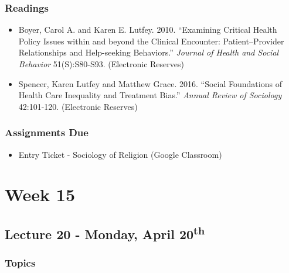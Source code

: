 \documentclass[]{book}
\providecommand{\tightlist}{%
  \setlength{\itemsep}{0pt}\setlength{\parskip}{0pt}}
\begin{document}
\hypertarget{readings-23}{%
\subsubsection*{Readings}\label{readings-23}}

\begin{itemize}
\tightlist
\item
  Boyer, Carol A. and Karen E. Lutfey. 2010. ``Examining Critical Health Policy Issues within and beyond the Clinical Encounter: Patient--Provider Relationships and Help-seeking Behaviors.'' \emph{Journal of Health and Social Behavior} 51(S):S80-S93. (Electronic Reserves)
\item
  Spencer, Karen Lutfey and Matthew Grace. 2016. ``Social Foundations of Health Care Inequality and Treatment Bias.'' \emph{Annual Review of Sociology} 42:101-120. (Electronic Reserves)
\end{itemize}

\hypertarget{assignments-due-5}{%
\subsubsection*{Assignments Due}\label{assignments-due-5}}

\begin{itemize}
\tightlist
\item
  Entry Ticket - Sociology of Religion (Google Classroom)
\end{itemize}

\newpage

\hypertarget{week-15}{%
\section*{Week 15}\label{week-15}}

\hypertarget{lecture-20---monday-april-20th}{%
\subsection*{\texorpdfstring{Lecture 20 - Monday, April 20\textsuperscript{th}}{Lecture 20 - Monday, April 20th}}\label{lecture-20---monday-april-20th}}

\hypertarget{topics-26}{%
\subsubsection*{Topics}\label{topics-26}}
\end{document}
